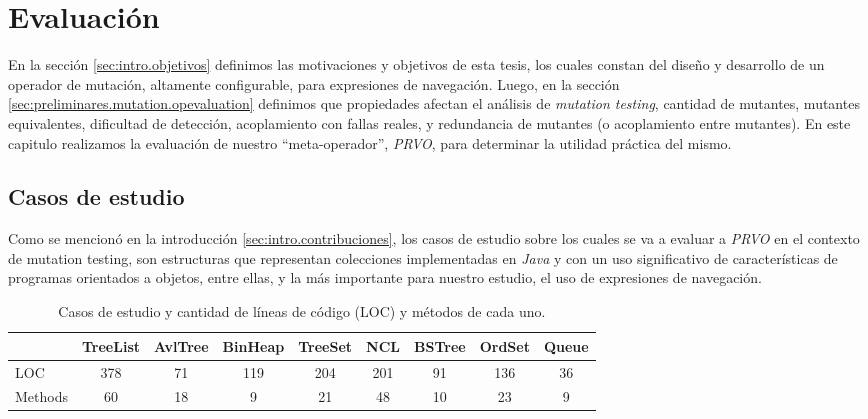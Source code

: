 \chapter[Evaluaci\'on]{Evaluaci\'on}
\label{cap:evaluation}

En la secci\'on \ref{sec:intro.objetivos} definimos las motivaciones y objetivos de esta tesis, los cuales constan del dise\~no y desarrollo de un operador de mutaci\'on, altamente configurable, para expresiones de navegaci\'on. Luego, en la secci\'on \ref{sec:preliminares.mutation.opevaluation} definimos que propiedades afectan el an\'alisis de \emph{mutation testing}, cantidad de mutantes, mutantes equivalentes, dificultad de detecci\'on, acoplamiento con fallas reales, y redundancia de mutantes (o acoplamiento entre mutantes). En este capitulo realizamos la evaluaci\'on de nuestro ``meta-operador'', \emph{PRVO}, para determinar la utilidad pr\'actica del mismo.

\section{Casos de estudio}
\label{sec:evaluation.benchmark}

Como se mencion\'o en la introducci\'on \ref{sec:intro.contribuciones}, los casos de estudio sobre los cuales se va a evaluar a \emph{PRVO} en el contexto de mutation testing, son estructuras que representan colecciones implementadas en \emph{Java} y con un uso significativo de caracter\'isticas de programas orientados a objetos, entre ellas, y la m\'as importante para nuestro estudio, el uso de expresiones de navegaci\'on. 

\begin{table}[]
	\caption[Casos de estudio]{Casos de estudio y cantidad de l\'ineas de c\'odigo (LOC) y m\'etodos de cada uno.}
	\label{tables.studyCases}
	\centering
	\footnotesize
	\def\arraystretch{1.15}
	\setlength\tabcolsep{1.7mm}
	\begin{tabular}{l|cccccccc|}
		\cline{2-9}
		& TreeList & AvlTree & BinHeap & TreeSet & NCL & BSTree & OrdSet & \multicolumn{1}{l|}{Queue} \\ \hline
		\multicolumn{1}{|l|}{LOC} & \multicolumn{1}{c|}{378} & \multicolumn{1}{c|}{71} & \multicolumn{1}{c|}{119} & \multicolumn{1}{c|}{204} & \multicolumn{1}{c|}{201} & \multicolumn{1}{c|}{91} & \multicolumn{1}{c|}{136} & 36 \\ \cline{1-1}
		\multicolumn{1}{|l|}{Methods} & \multicolumn{1}{c|}{60} & \multicolumn{1}{c|}{18} & \multicolumn{1}{c|}{9} & \multicolumn{1}{c|}{21} & \multicolumn{1}{c|}{48} & \multicolumn{1}{c|}{10} & \multicolumn{1}{c|}{23} & 9 \\ \hline
	\end{tabular}
\end{table}

